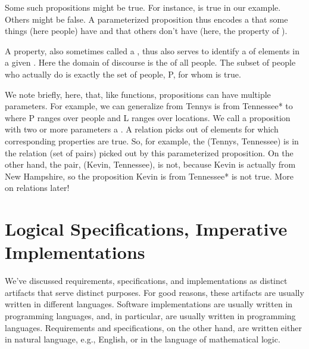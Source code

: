 \documentclass[letterpaper,10pt,english]{sphinxmanual}
\begin{document}
Some such propositions might be true. For instance,
 is true in our example. Others might be false. A
parameterized proposition thus encodes a  that some things
(here people) have and that others don’t have (here, the property of
).

A property, also sometimes called a , thus also serves to
identify a  of elements in a given . Here
the domain of discourse is the of all people. The subset of people who
actually do  is exactly the set of people, P, for whom
 is true.

We note briefly, here, that, like functions, propositions can have
multiple parameters. For example, we can generalize from  Tennys is from Tennessee* to  where P ranges over people and L ranges over locations. We
call a proposition with two or more parameters a . A
relation picks out  of elements for which corresponding
properties are true. So, for example, the  (Tennys, Tennessee)
is in the relation (set of  pairs) picked out by this
parameterized proposition. On the other hand, the pair, (Kevin,
Tennessee), is not, because Kevin is actually from New Hampshire, so
the proposition  Kevin is from Tennessee*
is not true. More on relations later!


\chapter{Logical Specifications, Imperative Implementations}
\label{\detokenize{02-logic-and-code:logical-specifications-imperative-implementations}}\label{\detokenize{02-logic-and-code::doc}}
We’ve discussed requirements, specifications, and implementations as
distinct artifacts that serve distinct purposes. For good reasons,
these artifacts are usually written in different languages. Software
implementations are usually written in programming languages, and, in
particular, are usually written in  programming languages.
Requirements and specifications, on the other hand, are written either
in natural language, e.g., English, or in the language of mathematical
logic.
\end{document}
